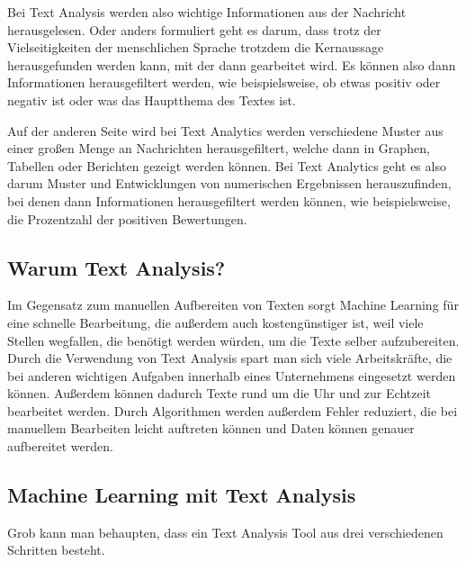 Bei Text Analysis werden also wichtige Informationen aus der Nachricht herausgelesen.
Oder anders formuliert geht es darum, dass trotz der Vielseitigkeiten der menschlichen Sprache trotzdem die Kernaussage herausgefunden werden kann, mit der dann gearbeitet wird.
Es können also dann Informationen herausgefiltert werden, wie beispielsweise, ob etwas positiv oder negativ ist oder was das Hauptthema des Textes ist.\cite{textAnalysisMonkeylearn, machineLearningTextAnalysis}

Auf der anderen Seite wird bei Text Analytics werden verschiedene Muster aus einer großen Menge an Nachrichten herausgefiltert, welche dann in Graphen, Tabellen oder Berichten gezeigt werden können.
Bei Text Analytics geht es also darum Muster und Entwicklungen von numerischen Ergebnissen herauszufinden, bei denen dann Informationen herausgefiltert werden können, wie beispielsweise, die Prozentzahl der positiven Bewertungen.\cite{textAnalysisMonkeylearn, machineLearningTextAnalysis}

\subsection{Warum Text Analysis?}

Im Gegensatz zum manuellen Aufbereiten von Texten sorgt Machine Learning für eine schnelle Bearbeitung, die außerdem auch kostengünstiger ist, weil viele Stellen wegfallen, die benötigt werden würden, um die Texte selber aufzubereiten.
Durch die Verwendung von Text Analysis spart man sich viele Arbeitskräfte, die bei anderen wichtigen Aufgaben innerhalb eines Unternehmens eingesetzt werden können.
Außerdem können dadurch Texte rund um die Uhr und zur Echtzeit bearbeitet werden.
Durch Algorithmen werden außerdem Fehler reduziert, die bei manuellem Bearbeiten leicht auftreten können und Daten können genauer aufbereitet werden.\cite{textAnalysisMonkeylearn}

\subsection{Machine Learning mit Text Analysis}

Grob kann man behaupten, dass ein Text Analysis Tool aus drei verschiedenen Schritten besteht.

